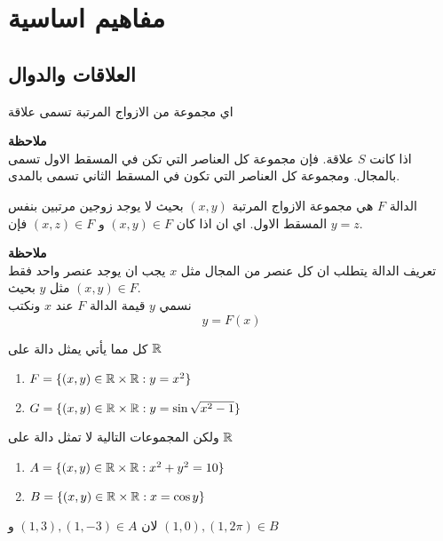 \chapter{مفاهيم اساسية}

\section{العلاقات والدوال}
\begin{definition}
	اي مجموعة من الازواج المرتبة تسمى علاقة
\end{definition}
\noindent
\textbf{ملاحظة}\\
اذا كانت $S$ علاقة. فإن مجموعة كل العناصر التي تكن في المسقط الاول تسمى بالمجال. ومجموعة كل العناصر التي  تكون في المسقط الثاني تسمى بالمدى.

\begin{definition}
	الدالة $F$ هي مجموعة الازواج المرتبة $(x, y)$ بحيث لا يوجد زوجين مرتبين بنفس المسقط الاول. اي ان اذا كان
	$(x, y) \in F$ و $(x,z) \in F$
	فإن  $y=z$.
\end{definition}
\noindent
\textbf{ملاحظة}\\
تعريف الدالة يتطلب ان كل عنصر من المجال مثل $x$ يجب ان يوجد عنصر واحد فقط  مثل $y$ بحيث $(x,y)\in F$.\\
نسمي $y$ قيمة الدالة $F$ عند $x$ ونكتب
\[
y = F(x)
\] 

\begin{example}
	كل مما يأتي يمثل دالة على $\mathbb{R}$
	\begin{english}
			\begin{enumerate}[label=$\bullet$]
			\item $F=\{(x, y)\in \mathbb{R}\times\mathbb{R} : y = x^2\}$
			\item $G=\{(x, y)\in \mathbb{R}\times\mathbb{R} : y = \sin \sqrt{x^2-1}\}$
		\end{enumerate}
	\end{english}
ولكن المجموعات التالية لا تمثل دالة على $\mathbb{R}$
	\begin{english}
			\begin{enumerate}[label=$\bullet$]
		\item $A=\{(x, y)\in \mathbb{R}\times\mathbb{R} : x^2 + y^2 = 10\}$
		\item $B=\{(x, y)\in \mathbb{R}\times\mathbb{R} : x = \cos y\}$
	\end{enumerate}
\end{english}
لان 
$(1,3), (1,-3) \in A$
و
$(1, 0), (1, 2\pi) \in B$
\end{example}

